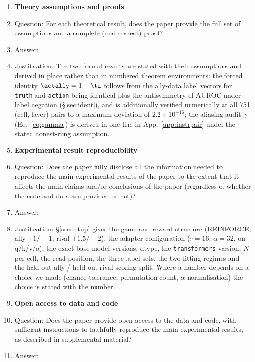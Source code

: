 \begin{enumerate}
\item {\bf Theory assumptions and proofs}
    \item[] Question: For each theoretical result, does the paper provide the full set of assumptions and a complete (and correct) proof?
    \item[] Answer: \answerYes{}
    \item[] Justification: The two formal results are stated with their assumptions and derived in place rather than in numbered theorem environments: the forced identity $\actally = 1 - \ta$ follows from the ally-data label vectors for \texttt{truth} and \texttt{action} being identical plus the antisymmetry of AUROC under label negation (\S\ref{sec:ident}), and is additionally verified numerically at all 751 (cell, layer) pairs to a maximum deviation of $2.2\times10^{-16}$; the aliasing audit $\gamma$ (Eq.~\ref{eq:gamma}) is derived in one line in App.~\ref{app:instrpair} under the stated honest-rung assumption.
    \item {\bf Experimental result reproducibility}
    \item[] Question: Does the paper fully disclose all the information needed to reproduce the main experimental results of the paper to the extent that it affects the main claims and/or conclusions of the paper (regardless of whether the code and data are provided or not)?
    \item[] Answer: \answerYes{}
    \item[] Justification: \S\ref{sec:setup} gives the game and reward structure (REINFORCE; ally $+1/-1$, rival $+1.5/-2$), the adapter configuration ($r{=}16$, $\alpha{=}32$, on q/k/v/o), the exact base-model versions, dtype, the \texttt{transformers} version, $N$ per cell, the read position, the three label sets, the two fitting regimes and the held-out ally / held-out rival scoring split. Where a number depends on a choice we made (chance tolerance, permutation count, $\alpha$ normalisation) the choice is stated with the number.
\item {\bf Open access to data and code}
    \item[] Question: Does the paper provide open access to the data and code, with sufficient instructions to faithfully reproduce the main experimental results, as described in supplemental material?
    \item[] Answer: \answerYes{}

\end{enumerate}
